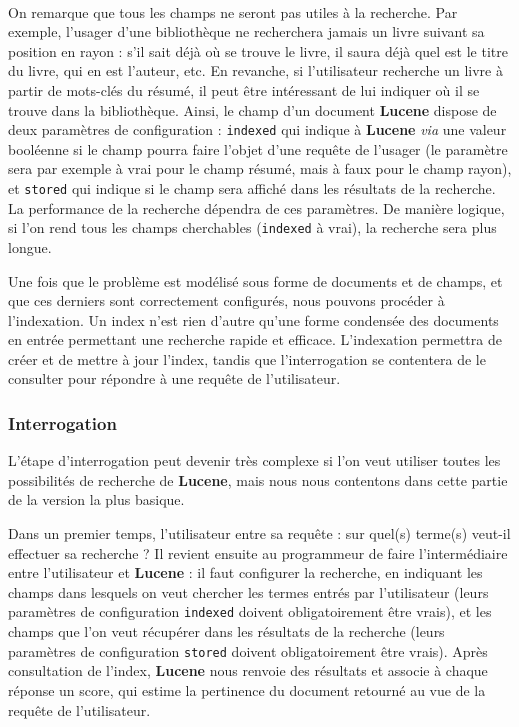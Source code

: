 ~~\\
On remarque que tous les champs ne seront pas utiles à la recherche. Par exemple, l’usager d’une bibliothèque ne recherchera jamais un livre suivant sa position en rayon : s’il sait déjà où se trouve le livre, il saura déjà quel est le titre du livre, qui en est l’auteur, etc. En revanche, si l’utilisateur recherche un livre à partir de mots-clés du résumé, il peut être intéressant de lui indiquer où il se trouve dans la bibliothèque. Ainsi, le champ d’un document \textbf{Lucene} dispose de deux paramètres de configuration : \texttt{indexed} qui indique à \textbf{Lucene} \textit{via} une valeur booléenne si le champ pourra faire l’objet d’une requête de l’usager (le paramètre sera par exemple à vrai pour le champ résumé, mais à faux pour le champ rayon), et \texttt{stored} qui indique si le champ sera affiché dans les résultats de la recherche. La performance de la recherche dépendra de ces paramètres. De manière logique, si l’on rend tous les champs cherchables (\texttt{indexed} à vrai), la recherche sera plus longue.

Une fois que le problème est modélisé sous forme de documents et de champs, et que ces derniers sont correctement configurés, nous pouvons procéder à l’indexation. Un index n’est rien d’autre qu’une forme condensée des documents en entrée permettant une recherche rapide et efficace. L’indexation permettra de créer et de mettre à jour l’index, tandis que l’interrogation se contentera de le consulter pour répondre à une requête de l’utilisateur.

\subsubsection{Interrogation}

L’étape d’interrogation peut devenir très complexe si l’on veut utiliser toutes les possibilités de recherche de \textbf{Lucene}, mais nous nous contentons dans cette partie de la version la plus basique.

Dans un premier temps, l’utilisateur entre sa requête : sur quel(s) terme(s) veut-il effectuer sa recherche ? Il revient ensuite au programmeur de faire l’intermédiaire entre l’utilisateur et \textbf{Lucene} : il faut configurer la recherche, en indiquant les champs dans lesquels on veut chercher les termes entrés par l’utilisateur (leurs paramètres de configuration \texttt{indexed} doivent obligatoirement être vrais), et les champs que l’on veut récupérer dans les résultats de la recherche (leurs paramètres de configuration \texttt{stored} doivent obligatoirement être vrais). Après consultation de l’index, \textbf{Lucene} nous renvoie des résultats et associe à chaque réponse un score, qui estime la pertinence du document retourné au vue de la requête de l’utilisateur.

